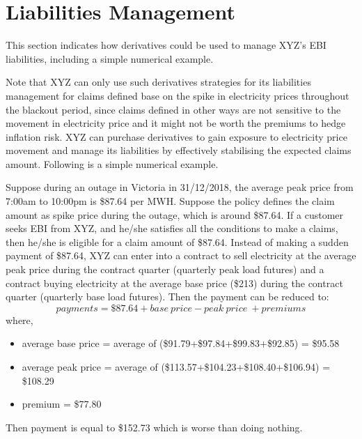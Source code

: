 \documentclass[12pt]{article}
\begin{document}
\section{Liabilities Management}
\begin{flushleft}
This section indicates how derivatives could be used to manage XYZ’s EBI liabilities, including a simple numerical example. \par
Note that XYZ can only use such derivatives strategies for its liabilities management for claims defined base on the spike in electricity prices throughout the blackout period, since claims defined in other ways are not sensitive to the movement in electricity price and it might not be worth the premiums to hedge inflation risk. XYZ can purchase derivatives to gain exposure to electricity price movement and manage its liabilities by effectively stabilising the expected claims amount. Following is a simple numerical example.\par
\end{flushleft}
Suppose during an outage in Victoria in 31/12/2018, the average peak price from 7:00am to 10:00pm is \$87.64 per MWH. Suppose the policy defines the claim amount as spike price during the outage, which is around \$87.64. If a customer seeks EBI from XYZ, and he/she satisfies all the conditions to make a claims, then he/she is eligible for a claim amount of \$87.64. Instead of making a sudden payment of \$87.64, XYZ can enter into a contract to sell electricity at the average peak price during the contract quarter (quarterly peak load futures) and a contract buying electricity at the average base price (\$213) during the contract quarter (quarterly base load futures). Then the payment can be reduced to:
$$ payments = \$87.64 + base\ price - peak\ price\ + premiums $$
where, 
\begin{itemize}
    \item average base price = average of (\$91.79+\$97.84+\$99.83+\$92.85) = \$95.58 \parencite{data1}
    \item average peak price = average of (\$113.57+\$104.23+\$108.40+\$106.94) = \$108.29 \parencite{data1}
    \item premium = \$77.80 \parencite{data2}
\end{itemize}
Then payment is equal to \$152.73 which is worse than doing nothing.
\frameboxend
\newpage

\end{document}
